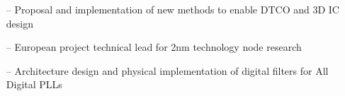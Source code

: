 \documentclass[10pt,a4paper,fancychapters]{altacv}
\begin{document}

\begin{itemize}
    \setlength{\itemindent}{0.5em}
    \item[--] \small{Proposal and implementation of new methods to enable DTCO and 3D IC design}
    \item[--] \small{European project technical lead for 2nm technology node research}
\end{itemize}




\begin{itemize}
    \setlength{\itemindent}{0.5em}
    \item[--]  \small {Architecture design and physical implementation of digital filters for All Digital PLLs}
    
\end{itemize}

\end{document}
